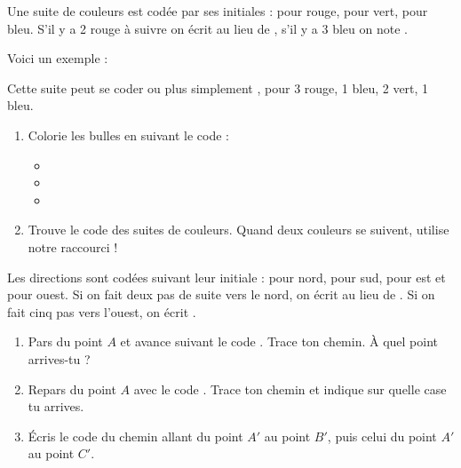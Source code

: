 \documentclass[class=report,crop=false, 12pt]{standalone}
\begin{document}

\begin{activite}
Une suite de couleurs est codée par ses initiales :  pour rouge,  pour vert,  pour bleu. 
S’il y a 2 rouge à suivre on écrit  au lieu de , s’il y a 3 bleu on note .

Voici un exemple :


Cette suite peut se coder  ou plus simplement , pour 3 rouge, 1 bleu, 2 vert, 1 bleu.

\begin{enumerate}
  \item  Colorie les bulles en suivant le code :
  \begin{itemize}
  \item {}

  
  \item {}
  

  \item {}

  
  \end{itemize}
  
  \item Trouve le code des suites de couleurs. Quand deux couleurs se suivent, utilise notre raccourci !

   
\end{enumerate}

\end{activite}


\begin{activite}
Les directions sont codées suivant leur initiale :  pour nord,  pour sud,  pour est et  pour ouest. Si on fait deux pas de suite vers le nord, on écrit  au lieu de . Si on fait cinq pas vers l’ouest, on écrit .
\begin{enumerate}
  \item  Pars du point $A$ et avance suivant le code . Trace ton chemin. À quel point arrives-tu ?
  

  \item Repars du point $A$ avec le code . Trace ton chemin et indique sur quelle case tu arrives.

 
   
  \item  Écris le code du chemin allant du point $A'$ au point $B'$, puis celui du point $A'$ au point $C'$.



\end{enumerate}
\end{activite}
\end{document}
